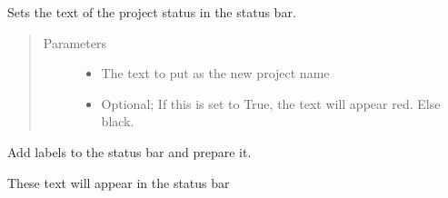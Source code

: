 \documentclass[letterpaper,10pt,english]{sphinxmanual}
\begin{document}
\begin{fulllineitems}
\begin{fulllineitems}
\end{fulllineitems}


\begin{fulllineitems}
\label{\detokenize{src:src.MainTab.MainTab.setProjectStatus}}
Sets the text of the project status in the status bar.
\begin{quote}\begin{description}
\item[{Parameters}] \leavevmode\begin{itemize}
\item {} 
 \textendash{} The text to put as the new project name

\item {} 
 \textendash{} Optional; If this is set to True, the text will appear red. Else black.

\end{itemize}

\end{description}\end{quote}

\end{fulllineitems}


\begin{fulllineitems}
\label{\detokenize{src:src.MainTab.MainTab.setupStatusBar}}
Add labels to the status bar and prepare it.

\end{fulllineitems}


\begin{fulllineitems}
\label{\detokenize{src:src.MainTab.MainTab.statusBarActiveStatuses}}
These text will appear in the status bar

\end{fulllineitems}



\end{fulllineitems}
\end{document}
